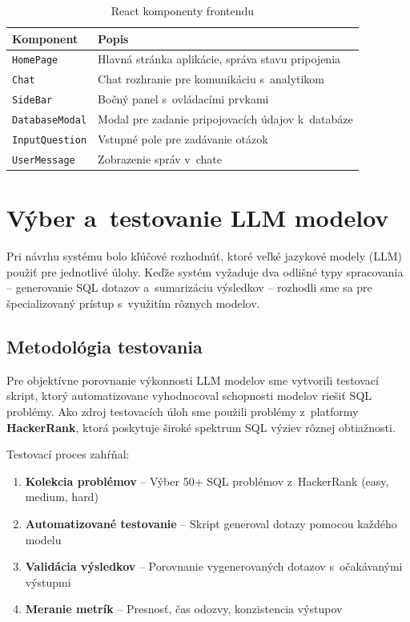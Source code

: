 \documentclass[a4paper, 12pt]{article}
\begin{document}
\begin{table}[H]
\centering
\begin{tabular}{lp{9cm}}
\toprule
\textbf{Komponent} & \textbf{Popis} \\
\midrule
\texttt{HomePage} & Hlavná stránka aplikácie, správa stavu pripojenia \\
\texttt{Chat} & Chat rozhranie pre komunikáciu s~analytikom \\
\texttt{SideBar} & Bočný panel s~ovládacími prvkami \\
\texttt{DatabaseModal} & Modal pre zadanie pripojovacích údajov k~databáze \\
\texttt{InputQuestion} & Vstupné pole pre zadávanie otázok \\
\texttt{UserMessage} & Zobrazenie správ v~chate \\
\bottomrule
\end{tabular}
\caption{React komponenty frontendu}
\end{table}

\clearpage

\section{Výber a~testovanie LLM modelov}

Pri návrhu systému bolo kľúčové rozhodnúť, ktoré veľké jazykové modely (LLM) použiť pre jednotlivé úlohy. Keďže systém vyžaduje dva odlišné typy spracovania -- generovanie SQL dotazov a~sumarizáciu výsledkov -- rozhodli sme sa pre špecializovaný prístup s~využitím rôznych modelov.

\subsection{Metodológia testovania}

Pre objektívne porovnanie výkonnosti LLM modelov sme vytvorili testovací skript, ktorý automatizovane vyhodnocoval schopnosti modelov riešiť SQL problémy. Ako zdroj testovacích úloh sme použili problémy z~platformy \textbf{HackerRank}, ktorá poskytuje široké spektrum SQL výziev rôznej obtiažnosti.

Testovací proces zahŕňal:
\begin{enumerate}
    \item \textbf{Kolekcia problémov} -- Výber 50+ SQL problémov z~HackerRank (easy, medium, hard)
    \item \textbf{Automatizované testovanie} -- Skript generoval dotazy pomocou každého modelu
    \item \textbf{Validácia výsledkov} -- Porovnanie vygenerovaných dotazov s~očakávanými výstupmi
    \item \textbf{Meranie metrík} -- Presnosť, čas odozvy, konzistencia výstupov
\end{enumerate}
\end{document}
